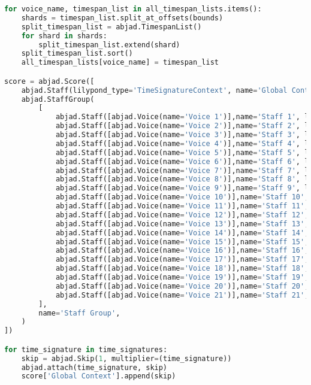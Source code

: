 \begin{lstlisting}[language=Python, caption=Invocation Source Code]
for voice_name, timespan_list in all_timespan_lists.items():
    shards = timespan_list.split_at_offsets(bounds)
    split_timespan_list = abjad.TimespanList()
    for shard in shards:
        split_timespan_list.extend(shard)
    split_timespan_list.sort()
    all_timespan_lists[voice_name] = timespan_list

score = abjad.Score([
    abjad.Staff(lilypond_type='TimeSignatureContext', name='Global Context'),
    abjad.StaffGroup(
        [
            abjad.Staff([abjad.Voice(name='Voice 1')],name='Staff 1', lilypond_type='Staff',),
            abjad.Staff([abjad.Voice(name='Voice 2')],name='Staff 2', lilypond_type='Staff',),
            abjad.Staff([abjad.Voice(name='Voice 3')],name='Staff 3', lilypond_type='Staff',),
            abjad.Staff([abjad.Voice(name='Voice 4')],name='Staff 4', lilypond_type='Staff',),
            abjad.Staff([abjad.Voice(name='Voice 5')],name='Staff 5', lilypond_type='Staff',),
            abjad.Staff([abjad.Voice(name='Voice 6')],name='Staff 6', lilypond_type='Staff',),
            abjad.Staff([abjad.Voice(name='Voice 7')],name='Staff 7', lilypond_type='Staff',),
            abjad.Staff([abjad.Voice(name='Voice 8')],name='Staff 8', lilypond_type='Staff',),
            abjad.Staff([abjad.Voice(name='Voice 9')],name='Staff 9', lilypond_type='Staff',),
            abjad.Staff([abjad.Voice(name='Voice 10')],name='Staff 10', lilypond_type='Staff',),
            abjad.Staff([abjad.Voice(name='Voice 11')],name='Staff 11', lilypond_type='Staff',),
            abjad.Staff([abjad.Voice(name='Voice 12')],name='Staff 12', lilypond_type='Staff',),
            abjad.Staff([abjad.Voice(name='Voice 13')],name='Staff 13', lilypond_type='Staff',),
            abjad.Staff([abjad.Voice(name='Voice 14')],name='Staff 14', lilypond_type='Staff',),
            abjad.Staff([abjad.Voice(name='Voice 15')],name='Staff 15', lilypond_type='Staff',),
            abjad.Staff([abjad.Voice(name='Voice 16')],name='Staff 16', lilypond_type='Staff',),
            abjad.Staff([abjad.Voice(name='Voice 17')],name='Staff 17', lilypond_type='Staff',),
            abjad.Staff([abjad.Voice(name='Voice 18')],name='Staff 18', lilypond_type='Staff',),
            abjad.Staff([abjad.Voice(name='Voice 19')],name='Staff 19', lilypond_type='Staff',),
            abjad.Staff([abjad.Voice(name='Voice 20')],name='Staff 20', lilypond_type='Staff',),
            abjad.Staff([abjad.Voice(name='Voice 21')],name='Staff 21', lilypond_type='Staff',),
        ],
        name='Staff Group',
    )
])

for time_signature in time_signatures:
    skip = abjad.Skip(1, multiplier=(time_signature))
    abjad.attach(time_signature, skip)
    score['Global Context'].append(skip)


\end{lstlisting}
